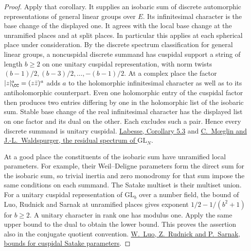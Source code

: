 \documentclass[a4paper,11pt]{article}
\theoremstyle{definition}
\theoremstyle{remark}
\numberwithin{equation}{section}
\begin{document}
\begin{proof}
Apply that corollary. It supplies an isobaric sum of discrete
automorphic representations of general linear groups over \(E\).
Its infinitesimal character is the base change of the displayed
one. It agrees with the local base change at the unramified
places and at split places. In particular this applies at each
spherical place under consideration. By the discrete spectrum
classification for general linear groups, a noncuspidal discrete
summand has cuspidal support a string of length \(b\ge2\) on one
unitary cuspidal representation, with norm twists
\((b-1)/2,(b-3)/2,\ldots,-(b-1)/2\). At a complex place
the factor \(|z|_{\CC}^{a}=(z\bar z)^a\) adds \(a\) to the
holomorphic infinitesimal character as well as to its
antiholomorphic counterpart. Even one holomorphic entry of
the cuspidal factor then produces two entries differing by
one in the holomorphic list of the isobaric sum. Stable base
change of the real infinitesimal character has the displayed
list on one factor and its dual on the other. Each excludes
such a pair. Hence every discrete summand is unitary cuspidal.
\href{https://webusers.imj-prg.fr/~michael.harris/CBCM.pdf}
{Labesse, Corollary 5.3} and
\href{https://www.numdam.org/articles/10.24033/asens.1595/}
{C.~M\oe glin and J.-L.~Waldspurger, the residual spectrum of
\(\mathrm{GL}_N\)}.

At a good place the constituents of the isobaric sum have
unramified local parameters. For example, their Weil--Deligne
parameters form the direct sum for the isobaric sum, so
trivial inertia and zero monodromy for that sum impose the
same conditions on each summand. The Satake multiset is their
multiset union. For a unitary cuspidal representation of
\(\mathrm{GL}_b\) over a number field, the bound of Luo, Rudnick
and Sarnak at unramified places gives exponent
\(1/2-1/(b^2+1)\) for \(b\ge2\). A unitary character in rank
one has modulus one. Apply the same upper bound to the dual
to obtain the lower bound. This proves the assertion also
in the conjugate quotient convention.
\href{https://doi.org/10.1090/pspum/066.2/1703764}
{W.~Luo, Z.~Rudnick and P.~Sarnak, bounds for cuspidal
Satake parameters}.
\end{proof}
\end{document}
